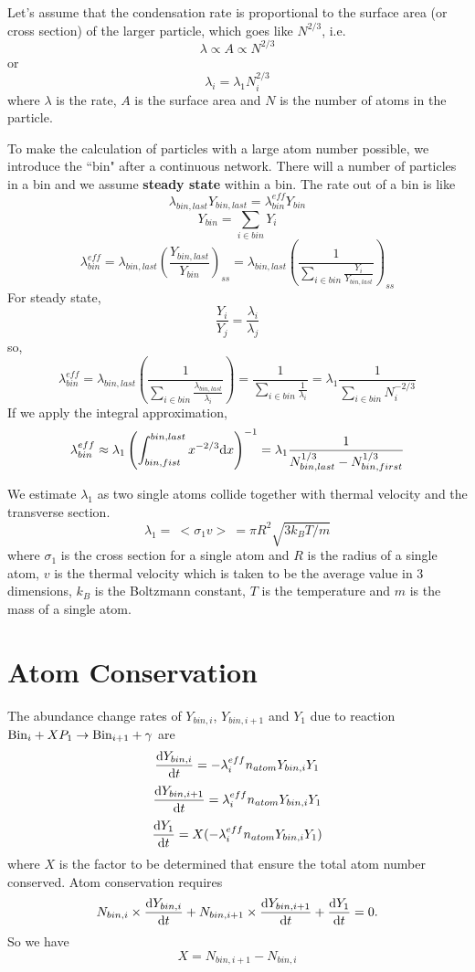 \documentclass{article}
\begin{document}
Let's assume that the condensation rate is proportional to the surface area
(or cross section) of the larger particle, which goes like $N^{2/3}$, i.e.
\[
\lambda \propto A \propto N^{2/3}
\]
or
\[
\lambda_i = \lambda_1 N_i^{2/3}
\]
where $\lambda$ is the rate, $A$ is the surface area and $N$ is the number 
of atoms in the particle.

To make the calculation of particles with a large atom number possible, we 
introduce
the ``bin" after a continuous network. There will a number of particles in a 
bin and we assume \textbf{steady state} within a bin.
The rate out of a bin is like
\[
\lambda_{bin,last}Y_{bin,last} = \lambda^{eff}_{bin}Y_{bin}
\]
\[
Y_{bin} = \sum_{i\in bin} Y_i
\]
\[
\lambda^{eff}_{bin} = \lambda_{bin,last} \left(
  \frac{Y_{bin,last}}{Y_{bin}}
  \right)_{ss}
  = \lambda_{bin,last} \left(
  \frac{1}{\sum_{i\in bin} \frac{Y_i}{Y_{bin,last}} }
  \right)_{ss}
\]
For steady state,
\[
\frac{Y_i}{Y_j} = \frac{\lambda_i}{\lambda_j}
\]
so,
\[
\lambda^{eff}_{bin} = \lambda_{bin,last} \left(
  \frac{1}{\sum_{i\in bin} \frac{\lambda_{bin,last}}{\lambda_i} }
  \right)
  = \frac{1}{\sum_{i\in bin} \frac{1}{\lambda_i} }
  = \lambda_1 \frac{1}{\sum_{i\in bin} N_i^{-2/3}}
\]
If we apply the integral approximation,
\begin{equation}
\lambda^{eff}_{bin}
  \approx \lambda_1 \left( \int_{bin,fist}^{bin,last} x^{-2/3} {\rm d} x
  \right)^{-1}
  = \lambda_1 \frac{1}{N_{bin,last}^{1/3} - N_{bin,first}^{1/3}}
\label{eq:rate}
\end{equation}

We estimate $\lambda_1$ as two single atoms collide together with thermal 
velocity and the transverse section.
\begin{equation}
\lambda_1 = \: <\! \sigma_1 v\! > \: = \pi R^2 \sqrt{3k_BT/m}
\label{eq:k1}
\end{equation}
where $\sigma_1$ is the cross section for a single atom and $R$ is the radius
of a single atom, $v$ is the thermal velocity which is taken to be the average
value in 3 dimensions, $k_B$ is the Boltzmann constant, $T$ is the temperature
and $m$ is the mass of a single atom.

\section{Atom Conservation}

The abundance change rates of $Y_{bin,i}$, $Y_{bin,i+1}$ and $Y_1$
due to 
reaction ${\rm Bin}_i + X P_1 \to {\rm Bin}_{i+1} + \gamma$ are
\[
\frac{{\rm d}Y_{bin,i}}{{\rm d}t} =
  -\lambda_i^{eff} n_{atom} Y_{bin,i} Y_1
\]
\[
\frac{{\rm d}Y_{bin,i+1}}{{\rm d}t} =
  \lambda_i^{eff} n_{atom} Y_{bin,i} Y_1
\]
\[
\frac{{\rm d}Y_1}{{\rm d}t} =
  X( -\lambda_i^{eff} n_{atom} Y_{bin,i} Y_1 )
\]
where $X$ is the factor to be determined that ensure
the total atom number conserved. Atom conservation requires
\[
N_{bin,i} \times \frac{{\rm d}Y_{bin,i}}{{\rm d}t} +
N_{bin,i+1} \times \frac{{\rm d}Y_{bin,i+1}}{{\rm d}t} +
\frac{{\rm d}Y_1}{{\rm d}t} = 0.
\] 
So we have
\[
X = N_{bin,i+1} - N_{bin,i}
\]
\end{document}
